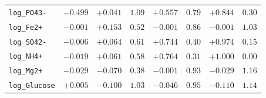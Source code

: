 \begin{table}[!htbp]
\begin{tabular}{lccccccc}
\texttt{log\_PO43-} & $-0.499$ & $+0.041$ & $1.09$ & $+0.557$ & $0.79$ & $+0.844$ & $0.30$ \\
\texttt{log\_Fe2+} & $-0.001$ & $+0.153$ & $0.52$ & $-0.001$ & $0.86$ & $-0.001$ & $1.03$ \\
\texttt{log\_SO42-} & $-0.006$ & $+0.064$ & $0.61$ & $+0.744$ & $0.40$ & $+0.974$ & $0.15$ \\
\texttt{log\_NH4+} & $-0.019$ & $+0.061$ & $0.58$ & $+0.764$ & $0.31$ & $+1.000$ & $0.00$ \\
\texttt{log\_Mg2+} & $-0.029$ & $-0.070$ & $0.38$ & $-0.001$ & $0.93$ & $-0.029$ & $1.16$ \\
\texttt{log\_Glucose} & $+0.005$ & $-0.100$ & $1.03$ & $-0.046$ & $0.95$ & $-0.110$ & $1.14$ \\
\bottomrule
\end{tabular}
\end{table}
